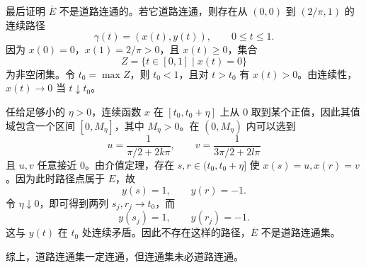 \begin{xsolution}
最后证明 $\overline E$ 不是道路连通的。若它道路连通，则存在从 $(0,0)$ 到 $(2/\pi,1)$ 的连续路径
\[
  \gamma(t)=(x(t),y(t)),\qquad 0\leq t\leq1.
\]
因为 $x(0)=0$，$x(1)=2/\pi>0$，且 $x(t)\geq0$，集合
\[
  Z=\{t\in[0,1]\mid x(t)=0\}
\]
为非空闭集。令 $t_0=\max Z$，则 $t_0<1$，且对 $t>t_0$ 有 $x(t)>0$。由连续性，$x(t)\to0$ 当 $t\downarrow t_0$。

任给足够小的 $\eta>0$，连续函数 $x$ 在 $[t_0,t_0+\eta]$ 上从 $0$ 取到某个正值，因此其值域包含一个区间 $[0,M_\eta]$，其中 $M_\eta>0$。在 $(0,M_\eta)$ 内可以选到
\[
  u=\frac1{\pi/2+2k\pi},
  \qquad
  v=\frac1{3\pi/2+2l\pi}
\]
且 $u,v$ 任意接近 $0$。由介值定理，存在 $s,r\in(t_0,t_0+\eta]$ 使 $x(s)=u,x(r)=v$。因为此时路径点属于 $E$，故
\[
  y(s)=1,
  \qquad
  y(r)=-1.
\]
令 $\eta\downarrow0$，即可得到两列 $s_j,r_j\to t_0$，而
\[
  y(s_j)=1,
  \qquad
  y(r_j)=-1.
\]
这与 $y(t)$ 在 $t_0$ 处连续矛盾。因此不存在这样的路径，$\overline E$ 不是道路连通集。

综上，道路连通集一定连通，但连通集未必道路连通。
\end{xsolution}


